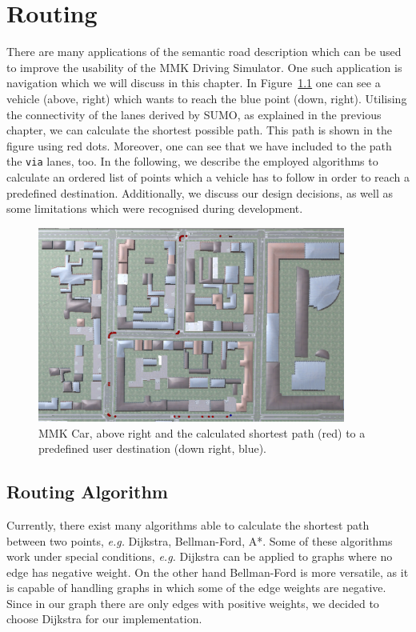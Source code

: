 \chapter{Routing}
\label{ch:gps}

There are many applications of the semantic road description which can be used to improve the usability of the MMK Driving Simulator. One such application is navigation which we will discuss in this chapter. In Figure~\ref{fig:nav} one can see a vehicle (above, right) which wants to reach the blue point (down, right). Utilising the connectivity of the lanes derived by SUMO, as explained in the previous chapter, we can calculate the shortest possible path. This path is shown in the figure using red dots. Moreover, one can see that we have included to the path the \texttt{via} lanes, too. In the following, we describe the employed algorithms to calculate an ordered list of points which a vehicle has to follow in order to reach a predefined destination. Additionally, we discuss our design decisions, as well as some limitations which were recognised during development.

\begin{figure}[htb]
	\centering
	\includegraphics[width=0.9\textwidth]{figures/nav}
	\caption{MMK Car, above right and the calculated shortest path (red) to a predefined user destination (down right, blue).}
	\label{fig:nav}
\end{figure}
\section{Routing Algorithm}
Currently, there exist many algorithms able to calculate the shortest path between two points, \emph{e.g.} Dijkstra, Bellman-Ford, A*. Some of these algorithms work under special conditions, \emph{e.g.} Dijkstra can be applied to graphs where no edge has negative weight. On the other hand Bellman-Ford is more versatile, as it is capable of handling graphs in which some of the edge weights are negative. Since in our graph there are only edges with positive weights, we decided to choose Dijkstra for our implementation.

